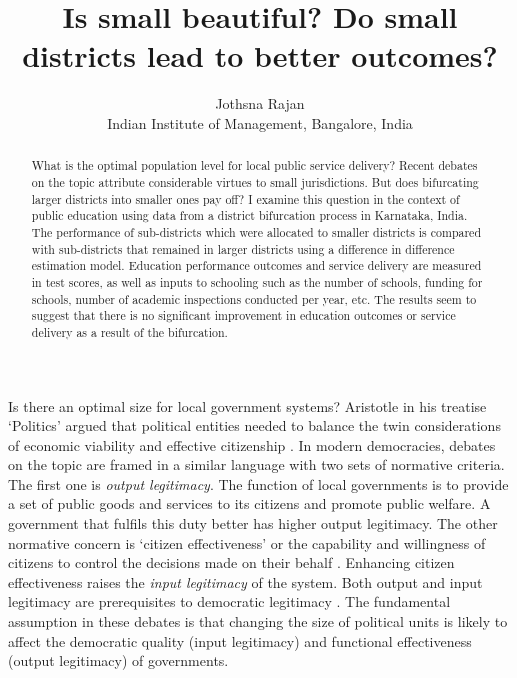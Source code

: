 \documentclass[12pt, a4paper]{article}
\title{Is small beautiful? Do small districts lead to better outcomes?}
\author{Jothsna Rajan \\
	\small{Indian Institute of Management, Bangalore, India}}
\begin{document}
	\maketitle
\begin{abstract}
	What is the optimal population level for local public service delivery? Recent debates on the topic attribute considerable virtues to small jurisdictions. But does bifurcating larger districts into smaller ones pay off? I examine this question in the context of public education using data from a district bifurcation process in Karnataka, India. The performance of sub-districts which were allocated to smaller districts is compared with sub-districts that remained in larger districts using a difference in difference estimation model. Education performance outcomes and service delivery are measured in test scores, as well as inputs to schooling such as the number of schools, funding for schools, number of academic inspections conducted per year, etc. The results seem to suggest that there is no significant improvement in education outcomes or service delivery as a result of the bifurcation. 
\end{abstract}
\paragraph{} Is there an optimal size for local government systems? Aristotle in his treatise `Politics' argued that political entities needed to balance the twin considerations of economic viability and effective citizenship \parencite{aristotle_politics_1984}. In modern democracies, debates on the topic are framed in a similar language with two sets of normative criteria. The first one is \textit{output legitimacy}. The function of local governments is to provide a set of public goods and services to its citizens and promote public welfare. A government that fulfils this duty better has higher output legitimacy. The other normative concern is `citizen effectiveness' or the capability and willingness of citizens to control the decisions made on their behalf \parencite{dahl_size_1973}. Enhancing citizen effectiveness raises the \textit{input legitimacy} of the system. Both output and input legitimacy are prerequisites to democratic legitimacy \parencite{scharpf_governing_1999}. The fundamental assumption in these debates is that changing the size of political units is likely to affect the democratic quality (input legitimacy) and functional effectiveness (output legitimacy) of governments. 
	
\end{document}
